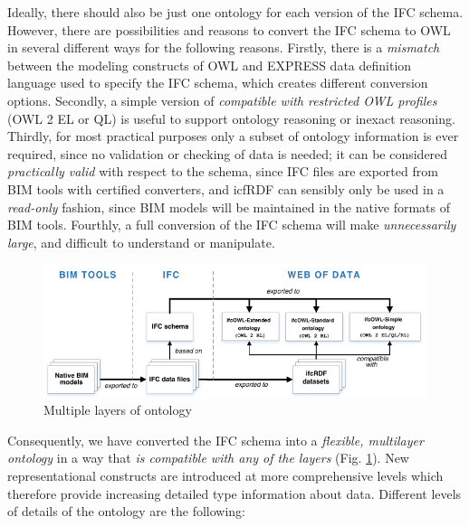 Ideally, there should also be just one \ifcowl{} ontology for each version of the IFC schema. However,
there are possibilities and reasons to convert the IFC schema to OWL in several different ways for
the following reasons. Firstly, there is a \emph{mismatch} between the modeling constructs of OWL and 
EXPRESS data definition language used to specify the IFC schema, which creates
different conversion options. Secondly, a simple version of \ifcowl{} \emph{compatible with
restricted OWL profiles} (OWL 2 EL or QL) is useful to support ontology
reasoning or inexact reasoning. Thirdly, for most practical purposes only a subset of ontology
information is ever required, since no validation or checking of \ifcrdf{} data is needed; it can
be considered \emph{practically valid} with respect to the schema, since IFC files are exported
from BIM tools with certified converters, and icfRDF can sensibly only be used in a
\emph{read-only} fashion, since BIM models will be maintained in the native formats of BIM
tools. Fourthly, a full conversion of the IFC schema will make \ifcowl{}
\emph{unnecessarily large}, and difficult to understand or manipulate.

\begin{figure}[h]
\centering
\includegraphics[angle=0,width=1.0\textwidth]{images/ifcOWL-multilayers.png}
\caption{Multiple layers of \ifcowl{} ontology}
\label{fig:ifcOWL-layers}
\end{figure}

Consequently, we have converted the IFC schema into a \emph{flexible, multilayer \ifcowl{} ontology}
in a way that \emph{\ifcrdf{} is compatible with any of the layers} (Fig. \ref{fig:ifcOWL-layers}). 
New representational constructs are introduced at more comprehensive levels which therefore 
provide increasing detailed type information about \ifcrdf{} data. Different levels of details of the \ifcowl{} ontology are the following:

